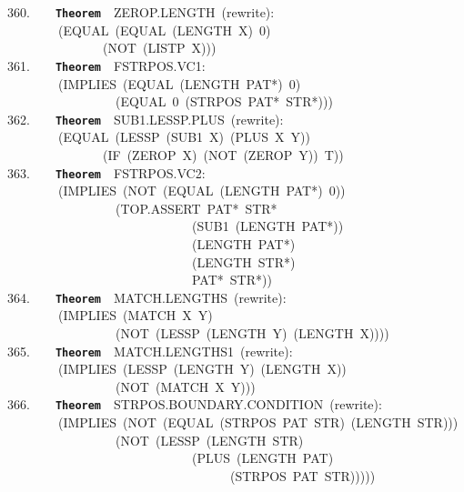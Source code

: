 \documentclass[11pt]{book}
\newenvironment{pubasis}{\begin{flushleft}\ttfamily\small}{\normalsize\rmfamily\end{flushleft}}
\newcommand{\axiomordefinition}[1]{\vspace{6pt}\texttt{\textbf{#1}}}
\begin{document}
\begin{pubasis}
360.~~~~\axiomordefinition{Theorem}~~ZEROP.LENGTH~(rewrite):\\
~~~~~~~~(EQUAL~(EQUAL~(LENGTH~X)~0)\\
~~~~~~~~~~~~~~~(NOT~(LISTP~X)))\\

361.~~~~\axiomordefinition{Theorem}~~FSTRPOS.VC1:\\
~~~~~~~~(IMPLIES~(EQUAL~(LENGTH~PAT*)~0)\\
~~~~~~~~~~~~~~~~~(EQUAL~0~(STRPOS~PAT*~STR*)))\\

362.~~~~\axiomordefinition{Theorem}~~SUB1.LESSP.PLUS~(rewrite):\\
~~~~~~~~(EQUAL~(LESSP~(SUB1~X)~(PLUS~X~Y))\\
~~~~~~~~~~~~~~~(IF~(ZEROP~X)~(NOT~(ZEROP~Y))~T))\\

363.~~~~\axiomordefinition{Theorem}~~FSTRPOS.VC2:\\
~~~~~~~~(IMPLIES~(NOT~(EQUAL~(LENGTH~PAT*)~0))\\
~~~~~~~~~~~~~~~~~(TOP.ASSERT~PAT*~STR*\\
~~~~~~~~~~~~~~~~~~~~~~~~~~~~~(SUB1~(LENGTH~PAT*))\\
~~~~~~~~~~~~~~~~~~~~~~~~~~~~~(LENGTH~PAT*)\\
~~~~~~~~~~~~~~~~~~~~~~~~~~~~~(LENGTH~STR*)\\
~~~~~~~~~~~~~~~~~~~~~~~~~~~~~PAT*~STR*))\\

364.~~~~\axiomordefinition{Theorem}~~MATCH.LENGTHS~(rewrite):\\
~~~~~~~~(IMPLIES~(MATCH~X~Y)\\
~~~~~~~~~~~~~~~~~(NOT~(LESSP~(LENGTH~Y)~(LENGTH~X))))\\

365.~~~~\axiomordefinition{Theorem}~~MATCH.LENGTHS1~(rewrite):\\
~~~~~~~~(IMPLIES~(LESSP~(LENGTH~Y)~(LENGTH~X))\\
~~~~~~~~~~~~~~~~~(NOT~(MATCH~X~Y)))\\

366.~~~~\axiomordefinition{Theorem}~~STRPOS.BOUNDARY.CONDITION~(rewrite):\\
~~~~~~~~(IMPLIES~(NOT~(EQUAL~(STRPOS~PAT~STR)~(LENGTH~STR)))\\
~~~~~~~~~~~~~~~~~(NOT~(LESSP~(LENGTH~STR)\\
~~~~~~~~~~~~~~~~~~~~~~~~~~~~~(PLUS~(LENGTH~PAT)\\
~~~~~~~~~~~~~~~~~~~~~~~~~~~~~~~~~~~(STRPOS~PAT~STR)))))\\


\end{pubasis}
\end{document}
